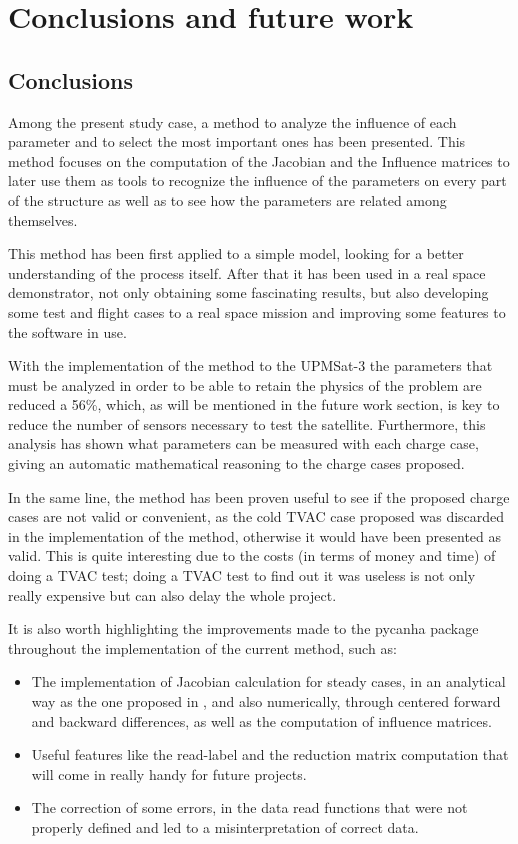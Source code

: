 \chapter{Conclusions and future work}\label{ch:05}

\section{Conclusions}
Among the present study case, a method to analyze the influence of each parameter and to select the most important ones has been presented. This method focuses on the computation of the Jacobian and the Influence matrices to later use them as tools to recognize the influence of the parameters on every part of the structure as well as to see how the parameters are related among themselves. 

This method has been first applied to a simple model, looking for a better understanding of the process itself. After that it has been used in a real space demonstrator,  not only obtaining some fascinating results, but also developing some test and flight cases to a real space mission and improving some features to the software in use.

With the implementation of the method to the UPMSat-3 the parameters that must be analyzed in order to be able to retain the physics of the problem are reduced a 56\%, which, as will be mentioned in the future work section, is key to reduce the number of sensors necessary to test the satellite. Furthermore, this analysis has shown what parameters can be measured with each charge case, giving an automatic mathematical reasoning to the charge cases proposed.

In the same line, the method has been proven useful to see if the proposed  charge cases are not valid or convenient, as the cold TVAC case proposed was discarded in the implementation of the method, otherwise it would have been presented as valid. This is quite interesting due to the costs (in terms of money and time) of doing a TVAC test; doing a TVAC test to find out it was useless is not only really expensive but can also delay the whole project.


It is also worth highlighting the improvements made to the pycanha package throughout the implementation of the current method, such as:
\begin{itemize}
    \item The implementation of Jacobian calculation for steady cases, in an analytical way as the one proposed in \cite{ignacio}, and also numerically, through centered forward and backward differences, as well as the computation of influence matrices.
    \item Useful features like the read-label and the reduction matrix computation that will come in really handy for future projects.
    \item The correction of some errors, in the data read functions that were not properly defined and led to a misinterpretation of correct data.
\end{itemize}


